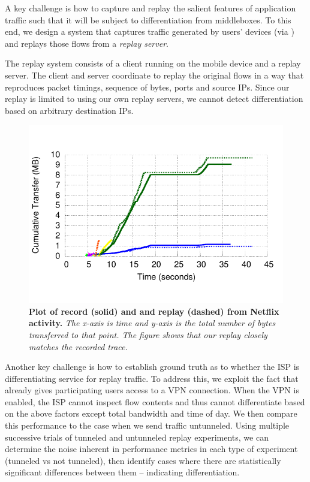 A key challenge is how to capture and replay 
the salient features of application traffic such that it will be subject to differentiation 
from middleboxes. To this end, we design a system that captures 
traffic generated by users' devices (via \meddle) and replays those flows 
from a \emph{replay server}. 

The replay system consists of a client running on the mobile device and a replay server. 
The client and server coordinate to replay the original flows in a way that reproduces packet timings, 
sequence of bytes, ports and source IPs. Since our replay is limited to using our own replay servers,
 we cannot detect differentiation based on arbitrary destination IPs. 


\begin{figure}
\centering
\includegraphics[width=0.9\linewidth]{plots/netflix_seqnum_wifi_vs_cell.pdf}
\caption{\textbf{Plot of record (solid) and and replay (dashed) from Netflix activity.} \emph{The x-axis is time and y-axis is the 
total number of bytes transferred to that point. The figure shows that our replay closely matches 
the recorded trace.}}
\vspace{\postfigspace}
\label{fig:replaySimilarity}
\end{figure}

Another key challenge is how to establish ground truth as to whether the ISP is 
differentiating service for replay traffic. To address this, we exploit the fact 
that \meddle already gives participating users access to a VPN connection. When the 
VPN is enabled, the ISP cannot inspect flow contents and thus cannot differentiate based 
on the above factors except total bandwidth and time of day. 
We then compare this performance to the case when we send traffic untunneled.  
Using multiple successive trials of tunneled and untunneled replay experiments, 
we can determine the noise inherent in performance metrics in each type of experiment (tunneled vs not tunneled), then 
identify cases where there are statistically significant differences between 
them -- indicating differentiation. 

